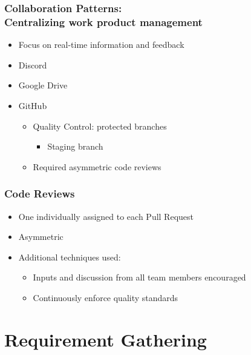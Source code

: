 \documentclass{beamer}
\begin{document}
\begin{frame}
\frametitle{Collaboration Patterns: \\ Centralizing work product management}
\begin{itemize}
 \item Focus on real-time information and feedback
 \item Discord
 \item Google Drive
 \item GitHub
  \begin{itemize}
   \item Quality Control: protected branches
     \begin{itemize}
        \item Staging branch
    \end{itemize}
   \item Required asymmetric code reviews
  \end{itemize}
\end{itemize}
\end{frame}


\begin{frame}
\frametitle{Code Reviews}
 \begin{itemize}
  \item One individually assigned to each Pull Request
  \item Asymmetric
  \item Additional techniques used:
   \begin{itemize}
    \item Inputs and discussion from all team members encouraged
    \item Continuously enforce quality standards
   \end{itemize}
\end{itemize}
\end{frame}



\section{Requirement Gathering}
\end{document}
